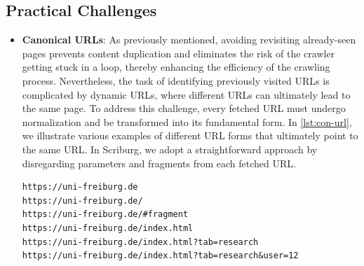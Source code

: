 \subsection{Practical Challenges}
\begin{itemize}
  \item[] \textbf{Canonical URLs}: As previously mentioned, avoiding revisiting already-seen pages prevents content duplication and eliminates the risk of the crawler getting stuck in a loop, thereby enhancing the efficiency of the crawling process. Nevertheless, the task of identifying previously visited URLs is complicated by dynamic URLs, where different URLs can ultimately lead to the same page. To address this challenge, every fetched URL must undergo normalization and be transformed into its fundamental form. In \ref{lst:con-url}, we illustrate various examples of different URL forms that ultimately point to the same URL. In Scriburg, we adopt a straightforward approach by disregarding parameters and fragments from each fetched URL.

\lstset{language=HTML}
\begin{lstlisting}[frame=single, caption={Example of different forms of the same URL.},captionpos=b, label={lst:con-url}]
https://uni-freiburg.de
https://uni-freiburg.de/
https://uni-freiburg.de/#fragment
https://uni-freiburg.de/index.html
https://uni-freiburg.de/index.html?tab=research
https://uni-freiburg.de/index.html?tab=research&user=12
\end{lstlisting}


\end{itemize}
